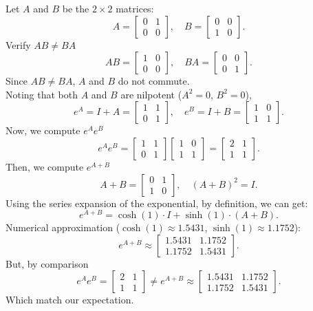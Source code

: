 \documentclass{article}
\begin{document}
Let \( A \) and \( B \) be the \( 2 \times 2 \) matrices:
\[
    A = \begin{bmatrix}
    0 & 1 \\ 0 & 0
    \end{bmatrix}, \quad
    B = \begin{bmatrix}
    0 & 0 \\ 1 & 0
    \end{bmatrix}.
\]
Verify \( AB \neq BA \)
\[
    AB = \begin{bmatrix} 1 & 0 \\ 0 & 0 \end{bmatrix}, \quad
    BA = \begin{bmatrix} 0 & 0 \\ 0 & 1 \end{bmatrix}.
\]
Since \( AB \neq BA \), \( A \) and \( B \) do not commute.
\\
Noting that both \( A \) and \( B \) are nilpotent (\( A^2 = 0 \), \( B^2 = 0 \)),
\[
    e^{A} = I + A = \begin{bmatrix}
    1 & 1 \\ 0 & 1
    \end{bmatrix}, \quad
    e^{B} = I + B = \begin{bmatrix}
    1 & 0 \\ 1 & 1
    \end{bmatrix}.
\]
Now, we compute \( e^{A} e^{B} \)
\[
    e^{A} e^{B} = \begin{bmatrix}
    1 & 1 \\ 0 & 1
    \end{bmatrix}
    \begin{bmatrix}
    1 & 0 \\ 1 & 1
    \end{bmatrix}
    = \begin{bmatrix}
    2 & 1 \\ 1 & 1
    \end{bmatrix}.
\]
Then, we compute \( e^{A+B} \)
\[
    A + B = \begin{bmatrix}
    0 & 1 \\ 1 & 0
    \end{bmatrix}, \quad
    (A+B)^2 = I.
\]
Using the series expansion of the exponential, by definition, we can get:
\[
    e^{A+B} = \cosh(1) \cdot I + \sinh(1) \cdot (A+B).
\]
Numerical approximation (\( \cosh(1) \approx 1.5431 \), \( \sinh(1) \approx 1.1752 \)):
\[
    e^{A+B} \approx \begin{bmatrix}
    1.5431 & 1.1752 \\ 1.1752 & 1.5431
    \end{bmatrix}.
\]
But, by comparison
\[
    e^{A} e^{B} = \begin{bmatrix}
    2 & 1 \\ 1 & 1
    \end{bmatrix} \neq
    e^{A+B} \approx \begin{bmatrix}
    1.5431 & 1.1752 \\ 1.1752 & 1.5431
    \end{bmatrix}.
\]
Which match our expectation.
\end{document}
